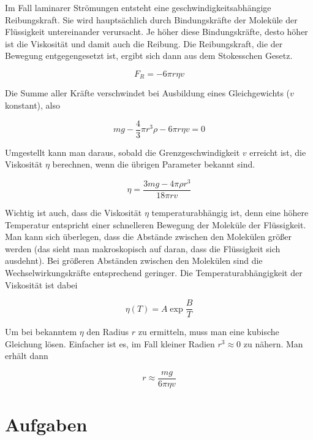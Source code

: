 \documentclass[a4paper,german,12pt,smallheadings]{scrartcl}
\begin{document}
Im Fall laminarer Strömungen entsteht eine geschwindigkeitsabhängige
Reibungskraft. Sie wird hauptsächlich durch Bindungskräfte der Moleküle der
Flüssigkeit untereinander verursacht. Je höher diese Bindungskräfte, desto
höher ist die Viskosität und damit auch die Reibung. Die Reibungskraft, die der
Bewegung entgegengesetzt ist, ergibt sich dann aus dem Stokesschen Gesetz.

\begin{equation}
  F_R = -6 \pi r \eta v
\end{equation}

Die Summe aller Kräfte verschwindet bei Ausbildung eines Gleichgewichts ($v$
konstant), also

\begin{equation}
  mg - \frac{4}{3} \pi r^3 \rho - 6 \pi r \eta v = 0
\end{equation}

Umgestellt kann man daraus, sobald die Grenzgeschwindigkeit $v$ erreicht ist,
die Viskosität $\eta$ berechnen, wenn die übrigen Parameter bekannt sind.

\begin{equation}
  \eta = \frac{3mg - 4 \pi \rho r^3}{18 \pi r v}
\end{equation}

Wichtig ist auch, dass die Viskosität $\eta$ temperaturabhängig ist, denn eine
höhere Temperatur entspricht einer schnelleren Bewegung der Moleküle der
Flüssigkeit. Man kann sich überlegen, dass die Abstände zwischen den Molekülen
größer werden (das sieht man makroskopisch auf daran, dass die Flüssigkeit sich
ausdehnt). Bei größeren Abständen zwischen den Molekülen sind die
Wechselwirkungskräfte entsprechend geringer. Die Temperaturabhängigkeit der
Viskosität ist dabei

\begin{equation}
  \eta(T) = A \exp \frac{B}{T}
\end{equation}

Um bei bekanntem $\eta$ den Radius $r$ zu ermitteln, muss man eine kubische
Gleichung lösen. Einfacher ist es, im Fall kleiner Radien $r^3 \approx 0$ zu
nähern. Man erhält dann

\begin{equation}
  r \approx \frac{mg}{6 \pi \eta v}
\end{equation}

\section*{Aufgaben}
\end{document}

